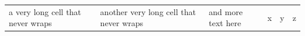\documentclass[11pt]{article}
\begin{document}
\begin{tabular}{llllll}
a very long cell that never wraps & another very long cell that never wraps & and more text here & x & y & z \\
\end{tabular}
\end{document}
